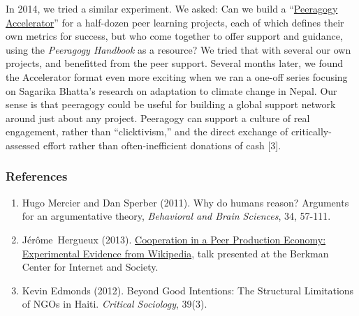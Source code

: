 In 2014, we tried a similar experiment.  We asked: Can we build a
``\href{http://commonsabundance.net/docs/help-build-the-peeragogy-accelerator-work-in-progress/}{Peeragogy
  Accelerator}'' for a half-dozen peer learning projects, each of
which defines their own metrics for success, but who come together to
offer support and guidance, using the \emph{Peeragogy Handbook} as a
resource?  We tried that with several our own projects, and benefitted
from the peer support.  Several months later, we found the Accelerator
format even more exciting when we ran a one-off series focusing on
Sagarika Bhatta's research on adaptation to climate change in Nepal.
Our sense is that peeragogy could be useful for building a global
support network around just about any project.  Peeragogy can support
a culture of real engagement, rather than ``clicktivism,'' and the
direct exchange of critically-assessed effort rather than
often-inefficient donations of cash [3].

\subsubsection{References}

\begin{enumerate}
\itemsep1pt\parskip0pt
\item
  Hugo Mercier and Dan Sperber (2011). Why do humans reason? Arguments
  for an argumentative theory, \emph{Behavioral and Brain Sciences}, 34,
  57-111.
\item
  Jérôme~Hergueux (2013). \href{https://cyber.law.harvard.edu/interactive/events/luncheons/2013/11/jerome}{Cooperation
  in a Peer Production Economy: Experimental Evidence from Wikipedia},
  talk presented at the Berkman Center for Internet and Society.
\item  Kevin Edmonds (2012).
Beyond Good Intentions: The Structural Limitations of NGOs in Haiti.  \emph{Critical Sociology}, 39(3).
\end{enumerate}
